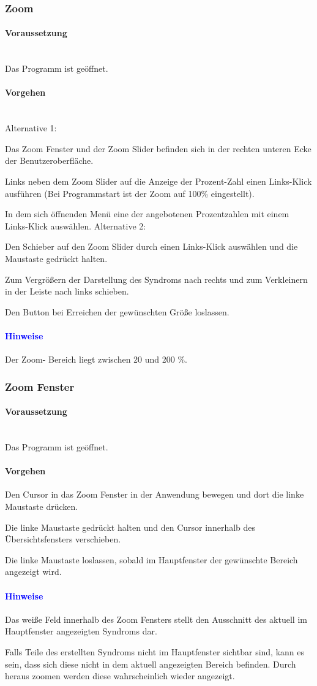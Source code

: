 \documentclass[enabledeprecatedfontcommands,fontsize=11pt,paper=a4,twoside]{scrartcl}
\newcounter{one}
\newcounter{two}[one]
\newcommand*{\hint}{\paragraph{\textcolor{blue}{Hinweise}}}
\newcommand*{\condition}{\paragraph{Voraussetzung}$\;$ \vspace{0.2cm}\\}
\newcommand*{\actions}{\paragraph{Vorgehen} $\;$\vspace{0.2cm}\\}
\newcommand*{\action}{\paragraph{Vorgehen}}
\newcommand*{\aOne}{\textcolor{bbe}{Alternative 1:}}
\newcommand*{\aTwo}{\textcolor{bbe}{Alternative 2:}}
\let\tempone\itemize
\let\temptwo\enditemize
\renewenvironment{itemize}{\tempone\addtolength{\itemsep}{-10.0pt}}{\temptwo}
\let\origenumerate\enumerate
\let\origendenumerate\endenumerate
\renewenvironment{enumerate}{\origenumerate \addtolength{\itemsep}{-10.0pt}}{\origendenumerate}
\begin{document}
		\subsubsection{Zoom}
		\condition 	
		Das Programm ist geöffnet.
		\actions
		\aOne
		\begin{enumerate}
			\item Das Zoom Fenster und der Zoom Slider befinden sich in der rechten unteren Ecke der Benutzeroberfläche.
			\item Links neben dem Zoom Slider auf die Anzeige der Prozent-Zahl einen Links-Klick ausführen (Bei Programmstart ist der Zoom auf 100\% eingestellt). 
			\item In dem sich öffnenden Menü eine der angebotenen Prozentzahlen mit einem Links-Klick auswählen.
		\end{enumerate}
		\aTwo
		\begin{enumerate}
			\item Den Schieber auf den Zoom Slider durch einen Links-Klick auswählen und die Maustaste gedrückt halten. 
			\item Zum Vergrößern der Darstellung des Syndroms nach rechts und zum Verkleinern in der Leiste nach links schieben.
			\item Den Button bei Erreichen der gewünschten Größe loslassen.
		\end{enumerate}
		\hint
		\begin{itemize}
			\item Der Zoom- Bereich liegt zwischen 20 und 200 \%.
	 	\end{itemize}		

\newpage	
		\subsubsection{Zoom Fenster}
		\condition 	
		Das Programm ist geöffnet.
		\action
		\begin{enumerate}
				\item Den Cursor in das Zoom Fenster in der Anwendung bewegen und dort die linke Maustaste drücken.
				\item Die linke Maustaste gedrückt halten und den Cursor innerhalb des Übersichtsfensters verschieben.
				\item Die linke Maustaste loslassen, sobald im Hauptfenster der gewünschte Bereich angezeigt wird.
		\end{enumerate}
		\hint
		\begin{itemize}
				\item Das weiße Feld innerhalb des Zoom Fensters stellt den Ausschnitt des aktuell im Hauptfenster angezeigten Syndroms dar.
				\item Falls Teile des erstellten Syndroms nicht im Hauptfenster sichtbar sind, kann es sein, dass sich diese nicht in dem aktuell angezeigten Bereich befinden. Durch heraus zoomen werden diese wahrscheinlich wieder angezeigt.  
	 	\end{itemize}
 	
\end{document}
